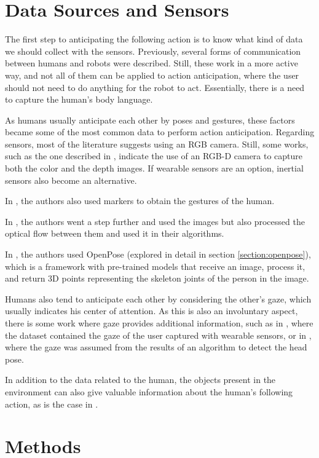\section{Data Sources and Sensors}

The first step to anticipating the following action is to know what kind of data we should collect with the sensors. Previously, several forms of communication between humans and robots were described. Still, these work in a more active way, and not all of them can be applied to action anticipation, where the user should not need to do anything for the robot to act. Essentially, there is a need to capture the human's body language.

As humans usually anticipate each other by poses and gestures, these factors became some of the most common data to perform action anticipation. Regarding sensors, most of the literature suggests using an RGB camera. Still, some works, such as the one described in \cite{Moutinho2023}, indicate the use of an RGB-D camera to capture both the color and the depth images. If wearable sensors are an option, inertial sensors also become an alternative.

In \cite{Maeda2016}, the authors also used markers to obtain the gestures of the human.

In \cite{Gammulle2019, Wu2021, Rodriguez2019, Furnari2021}, the authors went a step further and used the images but also processed the optical flow between them and used it in their algorithms.

In \cite{Canuto2021}, the authors used OpenPose (explored in detail in section \ref{section:openpose}), which is a framework with pre-trained models that receive an image, process it, and return 3D points representing the skeleton joints of the person in the image.

Humans also tend to anticipate each other by considering the other's gaze, which usually indicates his center of attention. As this is also an involuntary aspect, there is some work where gaze provides additional information, such as in \cite{Schydlo2018}, where the dataset contained the gaze of the user captured with wearable sensors, or in \cite{Canuto2021}, where the gaze was assumed from the results of an algorithm to detect the head pose.

In addition to the data related to the human, the objects present in the environment can also give valuable information about the human's following action, as is the case in \cite{Furnari2021}.

\section{Methods}

